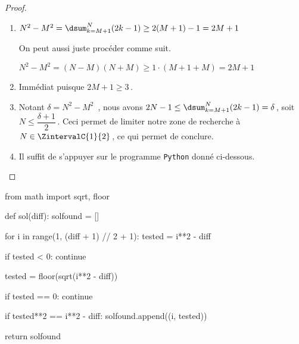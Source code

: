 \begin{proof}
	\leavevmode
	
	\vspace{-1ex}
	\begin{enumerate}
		\item $N^2 - M^2 = \dsum_{k=M+1}^{N} (2 k - 1) \geq 2(M + 1) - 1 = 2M + 1$
		
		\smallskip
		\noindent
		On peut aussi juste procéder comme suit. 
		
		\smallskip
		\noindent
		$N^2 - M^2 = (N - M)(N + M) \geq 1 \cdot (M + 1 + M) = 2M + 1$


		\item Immédiat puisque $2M + 1 \geq 3$\,.


		\item Notant $\delta = N^2 - M^2$ \,, nous avons $2 N - 1 \leq \dsum_{k=M+1}^{N} (2 k - 1) = \delta$\,, soit $N  \leq \dfrac{\delta + 1}{2}$\,.
		Ceci permet de limiter notre zone de recherche à $N \in \ZintervalC{1}{2}$\,, ce qui permet de conclure.
		

		\newpage
		\item Il suffit de s'appuyer sur le programme \verb#Python# donné ci-dessous.
		\qedhere
	\end{enumerate}
\end{proof}


\begin{Python}
from math import sqrt, floor

def sol(diff):
    solfound = []

    for i in range(1, (diff + 1) // 2 + 1):
        tested = i**2 - diff

        if tested < 0:
            continue

        tested = floor(sqrt(i**2 - diff))

        if tested == 0:
            continue

        if tested**2 == i**2 - diff:
            solfound.append((i, tested))

    return solfound
\end{Python}

